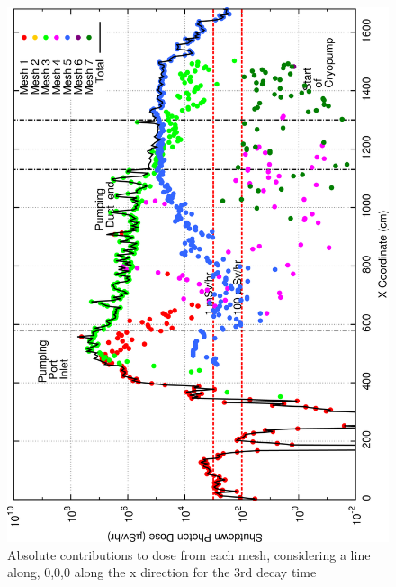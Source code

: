 \documentclass[12pt]{article}
\begin{document}
\begin{figure}[ht!]
\centering
\includegraphics[clip,scale=0.25]{../plots/crosstalk/nob4c/lp/dc3.png}
\caption{Absolute contributions to dose from each mesh, considering a line along, 0,0,0 along the x direction for the 3rd decay time}
\label{fig:ct_lp_dc3}
\end{figure}
\end{document}
